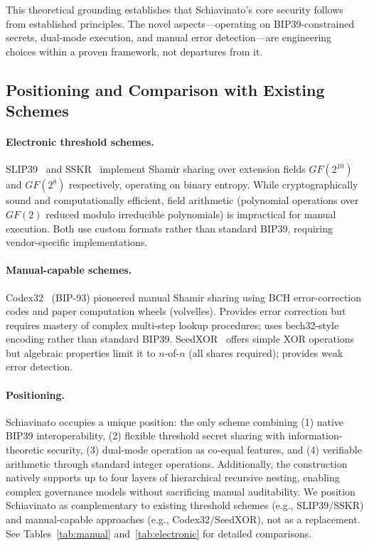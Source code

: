 \documentclass[11pt]{article}
\begin{document}
This theoretical grounding establishes that Schiavinato's core security follows from established principles. The novel aspects—operating on BIP39-constrained secrets, dual-mode execution, and manual error detection—are engineering choices within a proven framework, not departures from it.

\subsection{Positioning and Comparison with Existing Schemes}

\paragraph{Electronic threshold schemes.} SLIP39~\cite{slip39} and SSKR~\cite{sskr} implement Shamir sharing over extension fields $GF(2^{10})$ and $GF(2^8)$ respectively, operating on binary entropy. While cryptographically sound and computationally efficient, field arithmetic (polynomial operations over $GF(2)$ reduced modulo irreducible polynomials) is impractical for manual execution. Both use custom formats rather than standard BIP39, requiring vendor-specific implementations.

\paragraph{Manual-capable schemes.} Codex32~\cite{codex32} (BIP-93) pioneered manual Shamir sharing using BCH error-correction codes and paper computation wheels (volvelles). Provides error correction but requires mastery of complex multi-step lookup procedures; uses bech32-style encoding rather than standard BIP39. SeedXOR~\cite{seedxor} offers simple XOR operations but algebraic properties limit it to $n$-of-$n$ (all shares required); provides weak error detection.

\paragraph{Positioning.} Schiavinato occupies a unique position: the only scheme combining (1) native BIP39 interoperability, (2) flexible threshold secret sharing with information-theoretic security, (3) dual-mode operation as co-equal features, and (4) verifiable arithmetic through standard integer operations. Additionally, the construction natively supports up to four layers of hierarchical recursive nesting, enabling complex governance models without sacrificing manual auditability. We position Schiavinato as complementary to existing threshold schemes (e.g., SLIP39/SSKR) and manual-capable approaches (e.g., Codex32/SeedXOR), not as a replacement. See Tables~\ref{tab:manual} and~\ref{tab:electronic} for detailed comparisons.
\end{document}

